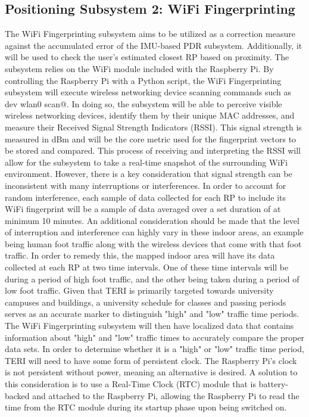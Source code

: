 \documentclass{article}
\begin{document}
\subsection{Positioning Subsystem 2: WiFi Fingerprinting}
The WiFi Fingerprinting subsystem aims to be utilized as a correction measure against the accumulated error of the IMU-based PDR subsystem. Additionally, it will be used to check the user's estimated closest RP based on proximity. The subsystem relies on the WiFi module included with the Raspberry Pi. By controlling the Raspberry Pi with a Python script, the WiFi Fingerprinting subsystem will execute wireless networking device scanning commands such as \verb@iw dev wlan0 scan@. In doing so, the subsystem will be able to perceive visible wireless networking devices, identify them by their unique MAC addresses, and measure their Received Signal Strength Indicators (RSSI). This signal strength is measured in dBm and will be the core metric used for the fingerprint vectors to be stored and compared. This process of receiving and interpreting the RSSI will allow for the subsystem to take a real-time snapshot of the surrounding WiFi environment. However, there is a key consideration that signal strength can be inconsistent with many interruptions or interferences. In order to account for random interference, each sample of data collected for each RP to include its WiFi fingerprint will be a sample of data averaged over a set duration of at minimum 10 minutes. An additional consideration should be made that the level of interruption and interference can highly vary in these indoor areas, an example being human foot traffic along with the wireless devices that come with that foot traffic. In order to remedy this, the mapped indoor area will have its data collected at each RP at two time intervals. One of these time intervals will be during a period of high foot traffic, and the other being taken during a period of low foot traffic. Given that TERI is primarily targeted towards university campuses and buildings, a university schedule for classes and passing periods serves as an accurate marker to distinguish "high" and "low" traffic time periods. The WiFi Fingerprinting subsystem will then have localized data that contains information about "high" and "low" traffic times to accurately compare the proper data sets. In order to determine whether it is a "high" or "low" traffic time period, TERI will need to have some form of persistent clock. The Raspberry Pi's clock is not persistent without power, meaning an alternative is desired. A solution to this consideration is to use a Real-Time Clock (RTC) module that is battery-backed and attached to the Raspberry Pi, allowing the Raspberry Pi to read the time from the RTC module during its startup phase upon being switched on.
\end{document}
